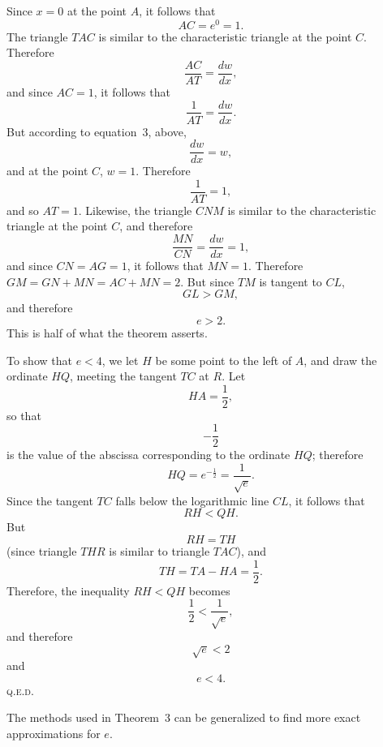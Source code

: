 \documentclass[twoside,openright]{article}
\begin{document}

Since $x=0$ at the point $A$, it follows that 
\[AC = e^0 = 1.\]
The triangle $TAC$ is similar to the characteristic triangle at the point $C$.  Therefore 
\[\frac{AC}{AT} =  \frac{dw}{dx},\]
and since $AC  =1$, it follows that 
\[\frac{1}{AT}= \frac{dw}{dx}.\]
But according to equation~3, above, 
\[\frac{dw}{dx} = w,\]
and at the point $C$, $w=1$.
Therefore 
\[\frac{1}{AT} = 1,\]
and so $AT =1$.
Likewise, the triangle $CNM$ is similar to the characteristic triangle at the point $C$, and therefore
\[\frac{MN}{CN} = \frac{dw}{dx} = 1,\]
and since $CN = AG =1$, it follows that $MN =1$.
Therefore $GM = GN + MN = AC + MN = 2$.  But since $TM$ is tangent to $CL$,
$$GL > GM,$$
and therefore 
$$e>2.$$  This is half of what the theorem asserts.

To show that $e<4$, we let $H$ be some point to the left of $A$, and draw the ordinate $HQ$, meeting the tangent $TC$ at $R$.    Let 
$$HA = \frac{1}{2},$$ so that 
$$-\frac{1}{2}$$
 is the value of the abscissa corresponding to the ordinate $HQ$; therefore 
$$HQ = e^{-\frac{1}{2}} = \frac{1}{\sqrt{e}}.$$
Since the tangent $TC$ falls below the logarithmic line $CL$, it follows that
$$RH <QH.$$
But 
$$RH = TH$$
(since triangle $THR$ is similar to triangle $TAC$),
and 
$$TH = TA - HA = \frac{1}{2}.$$
Therefore, the inequality $RH < QH$ becomes
$$\frac{1}{2}  < \frac{1}{\sqrt{e}},$$
and therefore
$$\sqrt{e} < 2$$
and 
$$e <4.$$ \textsc{q.e.d.}

The methods used in Theorem~3 can be generalized to find more exact approximations for $e$.


\end{document}
